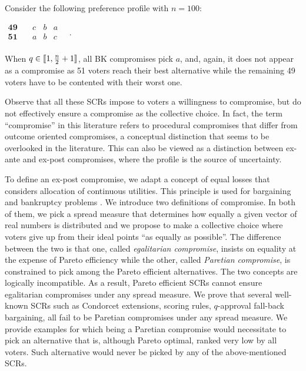 \begin{example}
	\label{ex:ex2}
	Consider the following preference profile with $n=100$:
	\begin{center}
		$
		\begin{array}{cccc}
			\mathbf{49} \quad &c&b&a\\
			\mathbf{51} \quad &a&b&c\\
		\end{array} \quad.
		$
	\end{center}
	When $q\in \llbracket1,\frac{n}{2}+1\rrbracket $, all BK compromises pick $a$, and, again, it does not appear as a compromise as 51 voters reach their best alternative while the remaining 49 voters have to be contented with their worst one. 
\end{example}

Observe that all these \acp{SCR} impose to voters a willingness to compromise, but do not effectively ensure a compromise as the collective choice. In fact, the term “compromise” in this literature refers to procedural compromises that differ from outcome oriented compromises, a conceptual distinction that seems to be overlooked in the literature.
This can also be viewed as a distinction between ex-ante and ex-post compromises, where the profile is the source of uncertainty.

To define an ex-post compromise, we adapt a concept of equal losses that considers allocation of continuous utilities. This principle is used for bargaining \citep{Chun1988, Chun1991} and bankruptcy problems \citep{Herrero2001}. 
We introduce two definitions of compromise. In both of them, we pick a spread measure that determines how equally a given vector of real numbers is distributed and we propose to make a collective choice where voters give up from their ideal points “as equally as possible”. The difference between the two is that one, called \emph{egalitarian compromise}, insists on equality at the expense of Pareto efficiency while the other, called \emph{Paretian compromise}, is constrained to pick among the Pareto efficient alternatives. 
The two concepts are logically incompatible. As a result, Pareto efficient \acp{SCR} cannot ensure egalitarian compromises under any spread measure. We prove that several well-known \acp{SCR} such as Condorcet extensions, scoring rules, $q$-approval fall-back bargaining, all fail to be Paretian compromises under any spread measure. We provide examples for which being a Paretian compromise would necessitate to pick an alternative that is, although Pareto optimal, ranked very low by all voters. Such alternative would never be picked by any of the above-mentioned \acp{SCR}. 

